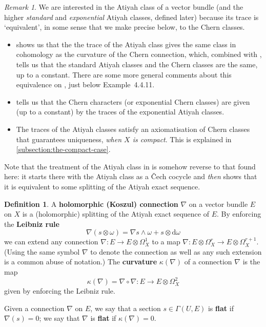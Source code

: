 \documentclass[11pt,fleqn]{article}
\theoremstyle{plain}
\theoremstyle{definition}
\newtheorem{definition}[theorem]{Definition}
\theoremstyle{remark}
\newtheorem{remark}[theorem]{Remark}
\numberwithin{equation}{theorem}
\newcommand{\define}[1]{\textbf{#1}}
\renewcommand{\d}{\mathrm{d}}
\begin{document}
        \begin{remark}
            We are interested in the Atiyah class of a vector bundle (and the higher \emph{standard} and \emph{exponential} Atiyah classes, defined later) because its trace is `equivalent', in some sense that we make precise below, to the Chern classes.
            \begin{itemize}
                \item \cite[Proposition~4.3.10]{Huybrechts2005} shows us that the the trace of the Atiyah class gives the same class in cohomology as the curvature of the Chern connection, which, combined with \cite[Example~4.4.8~i)]{Huybrechts2005}, tells us that the standard Atiyah classes and the Chern classes are the same, up to a constant.
                    There are some more general comments about this equivalence on \cite[p.~200]{Huybrechts2005}, just below Example~4.4.11.
                \item \cite[Exercise~4.4.11]{Huybrechts2005} tells us that the Chern characters (or exponential Chern classes) are given (up to a constant) by the traces of the exponential Atiyah classes.
                \item The traces of the Atiyah classes satisfy an axiomatisation of Chern classes that guarantees uniqueness, \emph{when $X$ is compact}.
                    This is explained in \cref{subsection:the-compact-case}.
            \end{itemize}

            Note that the treatment of the Atiyah class in \cite{Huybrechts2005} is somehow reverse to that found here: it starts there with the Atiyah class as a Čech cocycle and \emph{then} shows that it is equivalent to some splitting of the Atiyah exact sequence.
        \end{remark}

        \begin{definition}
            A \define{holomorphic (Koszul) connection} $\nabla$ on a vector bundle $E$ on $X$ is a (holomorphic) splitting of the Atiyah exact sequence of $E$.
            By enforcing the \define{Leibniz rule}
            \[
                \nabla(s\otimes\omega)
                =
                \nabla s\wedge\omega + s\otimes\d\omega
            \]
            we can extend any connection $\nabla\colon E\to E\otimes\Omega_X^1$ to a map $\nabla\colon E\otimes\Omega_X^r\to E\otimes\Omega_X^{r+1}$.
            (Using the same symbol $\nabla$ to denote the connection as well as any such extension is a common abuse of notation.)
            The \define{curvature} $\kappa(\nabla)$ of a connection $\nabla$ is the map
            \[
                \kappa(\nabla)=\nabla\circ\nabla\colon
                E\to E\otimes\Omega_X^2
            \]
            given by enforcing the Leibniz rule.

            Given a connection $\nabla$ on $E$, we say that a section $s\in\Gamma(U,E)$ is \define{flat} if $\nabla(s)=0$; we say that $\nabla$ is \define{flat} if $\kappa(\nabla)=0$.
        \end{definition}
\end{document}
